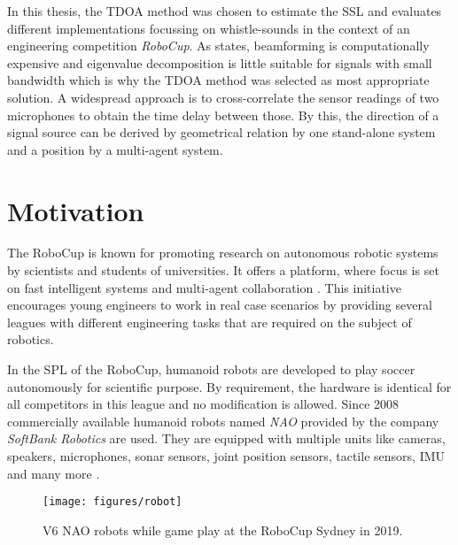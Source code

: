 In this thesis, the \ac{TDOA} method was chosen to estimate the \ac{SSL} and evaluates
different implementations focussing on whistle-sounds in the context of an engineering competition
\textit{\ac{RoboCup}}.
As \cite{BAS_estimator} states, beamforming is computationally expensive and eigenvalue
decomposition is little suitable
for signals with small bandwidth which is why the \ac{TDOA} method was selected as most
appropriate solution.
A widespread approach is to cross-correlate the sensor readings of two microphones
to obtain the time delay between those.
By this, the direction of a signal source can be derived by geometrical relation by one
stand-alone system and a position by a multi-agent system.

\section{Motivation}

The \acf{RoboCup} is known for promoting research on autonomous robotic systems
by scientists and students of universities.
It offers a platform, where focus is set on fast intelligent systems and multi-agent
collaboration \cite{robocup}.
This initiative encourages young engineers to work in real case scenarios
by providing several leagues with different engineering tasks that are required
on the subject of robotics.

In the \ac{SPL} of the \ac{RoboCup}, humanoid robots are developed to play soccer autonomously
for scientific purpose.
By requirement, the hardware is identical for all competitors in this league and no modification
is allowed.
Since 2008 commercially available humanoid robots named \textit{NAO} provided by the
company \textit{SoftBank Robotics} are used.
They are equipped with multiple units like cameras, speakers, microphones, sonar sensors,
joint position sensors, tactile sensors, \ac{IMU} and many more \cite{nao_docu}.
\begin{figure}[ht]
	\centering
        \texttt{[image: figures/robot]}
	\caption[NAO robot]{V6 NAO robots while game play at the \ac{RoboCup} Sydney in 2019.}
	\label{fig:01_robot}
\end{figure}

